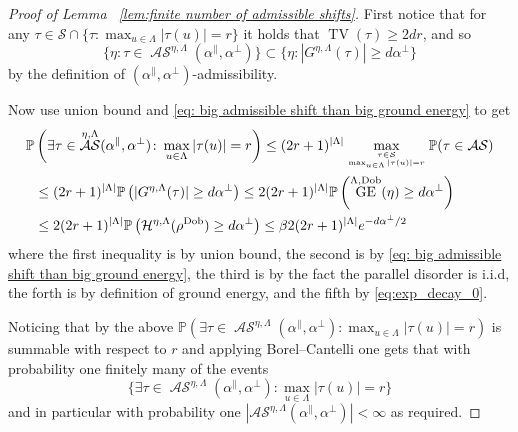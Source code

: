 \documentclass[11pt, reqno]{amsart}
\DeclareMathOperator{\Dob}{Dob}
\DeclareMathOperator{\GE}{GE}
\DeclareMathOperator{\TV}{TV}
\DeclareMathOperator{\AS}{\mathcal{AS}}
\renewcommand{\P}{\mathbb{P}}
\newcommand\mysubstack[2]{\genfrac{}{}{0pt}{}{#1}{#2}}
\numberwithin{equation}{section}
\begin{document}
\begin{proof}[Proof of Lemma ~\ref{lem:finite number of admissible shifts}] 
First notice that for any $\tau\in \mathcal{S} \cap \{\tau: \max_{u\in \Lambda} |\tau(u)| = r \} $ it holds that $\TV(\tau) \geq 2dr$, and so
\begin{equation}\label{eq: big admissible shift than big ground energy}
\{\eta: \tau\in \AS ^{\eta,\Lambda}(\alpha^{\parallel},\alpha^{\perp}) \}\subset 
\{\eta: |G^{\eta,\Lambda}(\tau)|\geq d {\alpha}^{\perp}\}
\end{equation}
by the definition of $({\alpha}^{\parallel},{\alpha}^{\perp})$-admissibility.

Now use union bound and \eqref{eq: big admissible shift than big ground energy} to get
\begin{align*}
\P &\left(\exists \tau \in \AS^{\eta,\Lambda}(\alpha^{\parallel},\alpha^{\perp}) \colon \max_{u\in \Lambda}|\tau(u)|=r \right) 
\leq (2r+1)^{|\Lambda|}
\max_{\mysubstack{\tau\in \mathcal{S}}{\max_{u\in \Lambda}|\tau(u)|=r} }\P (\tau \in \AS)\\
&\leq (2r+1)^{|\Lambda|} \P\left(|G^{\eta,\Lambda}(\tau)|\geq d {\alpha}^{\perp}  \right) \leq 2(2r+1)^{|\Lambda|} \P\left(\GE^{\Lambda,\Dob}(\eta)\geq d {\alpha}^{\perp}  \right)\\
&\leq 2(2r+1)^{|\Lambda|} 
\P\left(\mathcal{H}^{\eta,\Lambda}(\rho^{\Dob}) \geq d {\alpha}^{\perp} \right)\leq \beta 2(2r+1)^{|\Lambda|} e^{-d {\alpha}^{\perp}/2} 
\end{align*}
where the first inequality is by union bound, the second is by \eqref{eq: big admissible shift than big ground energy}, the third is by the fact the parallel disorder is i.i.d, the forth is by definition of ground energy, and the fifth by \eqref{eq:exp_decay_0}. 

Noticing that by the above $\P \left(\exists \tau \in \AS^{\eta,\Lambda}(\alpha^{\parallel},\alpha^{\perp}) \colon \max_{u\in \Lambda}|\tau(u)|=r \right)$ is summable with respect to $r$ and applying Borel--Cantelli one gets that with probability one finitely many of the events 
$$
\{\exists \tau \in \AS^{\eta,\Lambda}(\alpha^{\parallel},\alpha^{\perp}) \colon \max_{u\in \Lambda}|\tau(u)|=r \} 
$$
and in particular with probability one $|\mathcal{AS}^{\eta,\Lambda}(\alpha^{\parallel},\alpha^{\perp})|<\infty$ as required.
\end{proof}
\end{document}
